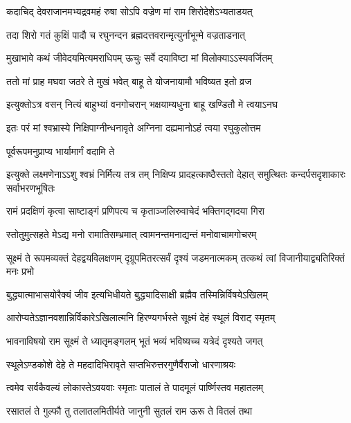 \twolineshloka
{कदाचिद् देवराजानमभ्यद्रवमहं रुषा}
{सोऽपि वज्रेण मां राम शिरोदेशेऽभ्यताडयत्} %

\twolineshloka
{तदा शिरो गतं कुक्षिं पादौ च रघुनन्दन}
{ब्रह्मदत्तवरान्मृत्युर्नाभून्मे वज्रताडनात्} %

\twolineshloka
{मुखाभावे कथं जीवेदयमित्यमराधिपम्}
{ऊचुः सर्वे दयाविष्टा मां विलोक्याऽऽस्यवर्जितम्} %

\twolineshloka
{ततो मां प्राह मघवा जठरे ते मुखं भवेत्}
{बाहू ते योजनायामौ भविष्यत इतो व्रज} %

\twolineshloka
{इत्युक्तोऽत्र वसन् नित्यं बाहुभ्यां वनगोचरान्}
{भक्षयाम्यधुना बाहू खण्डितौ मे त्वयाऽनघ} %

\twolineshloka
{इतः परं मां श्वभ्रास्ये निक्षिपाग्नीन्धनावृते}
{अग्निना दह्यमानोऽहं त्वया रघुकुलोत्तम} %

\onelineshloka
{पूर्वरूपमनुप्राप्य भार्यामार्गं वदामि ते} %


\threelineshloka
{इत्युक्ते लक्ष्मणेनाऽऽशु श्वभ्रं निर्मित्य तत्र तम्}
{निक्षिप्य प्रादहत्काष्ठैस्ततो देहात् समुत्थितः}
{कन्दर्पसदृशाकारः सर्वाभरणभूषितः} %

\twolineshloka
{रामं प्रदक्षिणं कृत्वा साष्टाङ्गं प्रणिपत्य च}
{कृताञ्जलिरुवाचेदं भक्तिगद्गदया गिरा} %


\twolineshloka
{स्तोतुमुत्सहते मेऽद्य मनो रामातिसम्भ्रमात्}
{त्वामनन्तमनाद्यन्तं मनोवाचामगोचरम्} %

\threelineshloka
{सूक्ष्मं ते रूपमव्यक्तं देहद्वयविलक्षणम्}
{दृग्रूपमितरत्सर्वं दृश्यं जडमनात्मकम्}
{तत्कथं त्वां विजानीयाद्व्यतिरिक्तं मनः प्रभो} %

\twolineshloka
{बुद्ध्यात्माभासयोरैक्यं जीव इत्यभिधीयते}
{बुद्ध्यादिसाक्षी ब्रह्मैव तस्मिन्निर्विषयेऽखिलम्} %

\twolineshloka
{आरोप्यतेऽज्ञानवशान्निर्विकारेऽखिलात्मनि}
{हिरण्यगर्भस्ते सूक्ष्मं देहं स्थूलं विराट् स्मृतम्} %

\twolineshloka
{भावनाविषयो राम सूक्ष्मं ते ध्यातृमङ्गलम्}
{भूतं भव्यं भविष्यच्च यत्रेदं दृश्यते जगत्} %

\twolineshloka
{स्थूलेऽण्डकोशे देहे ते महदादिभिरावृते}
{सप्तभिरुत्तरगुणैर्वैराजो धारणाश्रयः} %

\twolineshloka
{त्वमेव सर्वकैवल्यं लोकास्तेऽवयवाः स्मृताः}
{पातालं ते पादमूलं पार्ष्णिस्तव महातलम्} %

\twolineshloka
{रसातलं ते गुल्फौ तु तलातलमितीर्यते}
{जानुनी सुतलं राम ऊरू ते वितलं तथा} %

